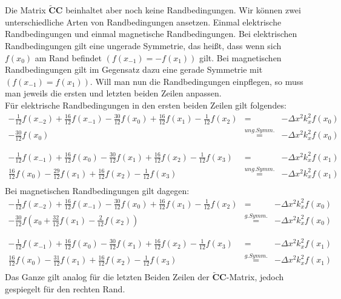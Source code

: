 \documentclass[Protokollheft.tex]{subfiles}
\begin{document}
Die Matrix $\mathbf{\widetilde{C}C}$ beinhaltet aber noch keine Randbedingungen. Wir können zwei unterschiedliche Arten von Randbedingungen ansetzen. Einmal elektrische Randbedingungen und einmal magnetische Randbedingungen. Bei elektrischen Randbedingungen gilt eine ungerade Symmetrie, das heißt, dass wenn sich $f(x_0)$ am Rand befindet $(f(x_{-1})=-f(x_{1}))$ gilt. Bei magnetischen Randbedingungen gilt im Gegensatz dazu eine gerade Symmetrie mit $(f(x_{-1})=f(x_{1}))$. Will man nun die Randbedingungen einpflegen, so muss man jeweils die ersten und letzten beiden Zeilen anpassen.\\
Für elektrische Randbedingungen in den ersten beiden Zeilen gilt folgendes:
\begin{eqnarray*}
-\frac{1}{12}f(x_{-2})+\frac{16}{12}f(x_{-1})-\frac{30}{12}f(x_0)+\frac{16}{12}f(x_{1})-\frac{1}{12}f(x_{2})&=&-\Delta x^2k^2_xf(x_0)\\
-\frac{30}{12}f(x_0)&\stackrel{ung. Symm.}{=}&-\Delta x^2k^2_xf(x_0)\\
\\
\\
-\frac{1}{12}f(x_{-1})+\frac{16}{12}f(x_{0})-\frac{30}{12}f(x_1)+\frac{16}{12}f(x_{2})-\frac{1}{12}f(x_{3})&=&-\Delta x^2k^2_xf(x_1)\\
\frac{16}{12}f(x_{0})-\frac{29}{12}f(x_1)+\frac{16}{12}f(x_{2})-\frac{1}{12}f(x_{3})&\stackrel{ung. Symm.}{=}&-\Delta x^2k^2_xf(x_1)\\
\end{eqnarray*}
Bei magnetischen Randbedingungen gilt dagegen:
\begin{eqnarray*}
	-\frac{1}{12}f(x_{-2})+\frac{16}{12}f(x_{-1})-\frac{30}{12}f(x_0)+\frac{16}{12}f(x_{1})-\frac{1}{12}f(x_{2})&=&-\Delta x^2k^2_xf(x_0)\\
	-\frac{30}{12}f(x_0+\frac{32}{12}f(x_{1})-\frac{2}{12}f(x_{2}))&\stackrel{g. Symm.}{=}&-\Delta x^2k^2_xf(x_0)\\
	\\
	\\
	-\frac{1}{12}f(x_{-1})+\frac{16}{12}f(x_{0})-\frac{30}{12}f(x_1)+\frac{16}{12}f(x_{2})-\frac{1}{12}f(x_{3})&=&-\Delta x^2k^2_xf(x_1)\\
	\frac{16}{12}f(x_{0})-\frac{31}{12}f(x_1)+\frac{16}{12}f(x_{2})-\frac{1}{12}f(x_{3})&\stackrel{g. Symm.}{=}&-\Delta x^2k^2_xf(x_1)\\
\end{eqnarray*}
Das Ganze gilt analog für die letzten Beiden Zeilen der $\mathbf{\widetilde{C}C}$-Matrix, jedoch gespiegelt für den rechten Rand.
\end{document}
